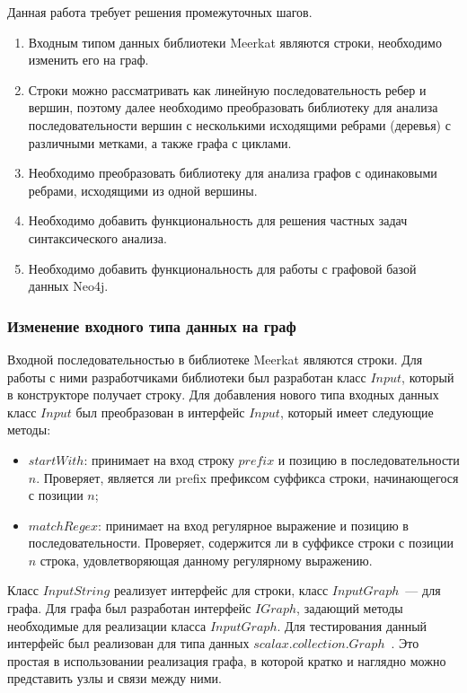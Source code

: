 Данная работа требует решения промежуточных шагов.
\begin{enumerate}
\item Входным типом данных библиотеки Meerkat являются строки, необходимо изменить его на граф.
\item Строки можно рассматривать как линейную последовательность ребер и вершин, поэтому далее необходимо преобразовать библиотеку для анализа последовательности вершин с несколькими исходящими ребрами (деревья) с различными метками, а также графа с циклами.
\item Необходимо преобразовать библиотеку для анализа графов с одинаковыми ребрами, исходящими из одной вершины.
\item Необходимо добавить функциональность для решения частных задач синтаксического анализа.
\item Необходимо добавить функциональность для работы с графовой базой данных Neo4j.
\end{enumerate}

\subsubsection{Изменение входного типа данных на граф}


Входной последовательностью в библиотеке Meerkat являются строки. Для работы с ними разработчиками библиотеки был разработан класс $Input$, который в конструкторе получает строку. Для добавления нового типа входных данных класс $Input$ был преобразован в интерфейс $Input$, который имеет следующие методы:
\begin{itemize}
\item $startWith$: принимает на вход строку $prefix$ и позицию в последовательности $n$. Проверяет, является ли prefix префиксом суффикса строки, начинающегося с позиции $n$;
\item $matchRegex$: принимает на вход регулярное выражение и позицию в последовательности. Проверяет, содержится ли в суффиксе строки с позиции $n$ строка, удовлетворяющая данному регулярному выражению.
\end{itemize}

Класс $InputString$ реализует интерфейс для строки, класс $InputGraph$~--- для графа. Для графа был разработан интерфейс $IGraph$, задающий методы необходимые для реализации класса $InputGraph$. Для тестирования данный интерфейс был реализован для типа данных $scalax.collection.Graph$~\cite{Graph}. Это простая в использовании реализация графа, в которой кратко и наглядно можно представить узлы и связи между ними.

